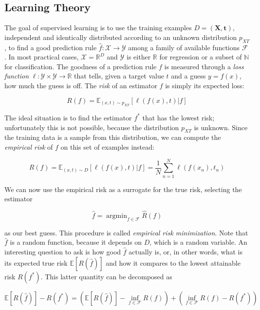 \documentclass[a4paper]{book}
\DeclareMathOperator*{\argmin}{argmin}
\begin{document}
\subsection{Learning Theory}
The goal of supervised learning is to use the training examples $D=(\bm X, \bm t)$, independent and identically distributed according to an unknown distribution $p_{XT}$, to find a good prediction rule $\hat{f}:\mathcal{X}\rightarrow\mathcal{Y}$ among a family of available functions $\mathcal{F}$. In most practical cases, $\mathcal{X}=\mathbb{R}^D$ and $\mathcal{Y}$ is either $\mathbb{R}$ for regression or a subset of $\mathbb{N}$ for classification. The goodness of a prediction rule $f$ is measured through a \emph{loss function} $\ell:\mathcal{Y}\times\mathcal{Y}\rightarrow\mathbb{R}$ that tells, given a target value $t$ and a guess $y=f(x)$, how much the guess is off. The \emph{risk} of an estimator $f$ is simply its expected loss:

\begin{equation}
R(f)=\mathbb{E}_{(x,t)\sim p_{XT}}\left[\ell(f(x),t) \vert f \right]
\end{equation}

The ideal situation is to find the estimator $f^*$ that has the lowest risk; unfortunately this is not possible, because the distribution $p_{XT}$ is unknown. Since the training data is a sample from this distribution, we can compute the \emph{empirical risk} of $f$ on this set of examples instead:

\begin{equation}
\hat{R}(f)=\mathbb{E}_{(x,t)\sim D}\left[\ell(f(x),t)\vert f\right]=\frac{1}{N}\sum_{n=1}^N \ell(f(x_n),t_n)
\end{equation}

We can now use the empirical risk as a surrogate for the true risk, selecting the estimator

\begin{equation}
\hat{f}=\argmin_{f\in\mathcal{F}}\hat{R}(f)
\end{equation}

as our best guess. This procedure is called \emph{empirical risk minimization}. Note that $\hat{f}$ is a random function, because it depends on $D$, which is a random variable. An interesting question to ask is how good $\hat{f}$ actually is, or, in other words, what is its expected true risk $\mathbb{E}[R(\hat{f})]$ and how it compares to the lowest attainable risk $R(f^*)$. This latter quantity can be decomposed as

\begin{equation}
\mathbb{E}[R(\hat{f})]-R(f^*)=
\left(\mathbb{E}[R(\hat{f})]-\inf_{f\in\mathcal{F}} R(f)\right)
+\left(\inf_{f\in\mathcal{F}} R(f)-R(f^*)\right)
\end{equation}
\end{document}
